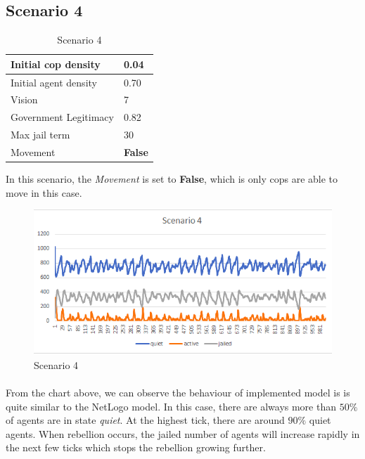 \documentclass[11pt]{article}
\begin{document}
      \subsection{Scenario 4}
      \begin{table}[ht]
        \begin{center}
          \begin{tabular}{|l|l|}
          \hline
            Initial cop density & 0.04 \\
          \hline
            Initial agent density & 0.70 \\
          \hline
            Vision & 7 \\
          \hline
            Government Legitimacy & 0.82 \\
          \hline
            Max jail term & 30 \\
          \hline
            Movement & \textbf{False} \\
          \hline
          \end{tabular}
          \caption{Scenario 4}\label{table4}
        \end{center}
      \end{table}
      In this scenario, the \textit{Movement} is set to \textbf{False}, which is
      only cops are able to move in this case.
      \begin{figure}[h!]
        \includegraphics[width=\linewidth]{Scenario_4.png}
        \caption{Scenario 4}
        \label{fig:scenario}
      \end{figure}
      \paragraph{}
      From the chart above, we can observe the behaviour of implemented model is
      is quite similar to the NetLogo model. In this case, there are always more than 
      $50\%$ of agents are in state \textit{quiet}. At the highest tick, there
      are around $90\%$ quiet agents. When rebellion occurs, the jailed number
      of agents will increase rapidly in the next few ticks which stops the rebellion
      growing further.
\end{document}
